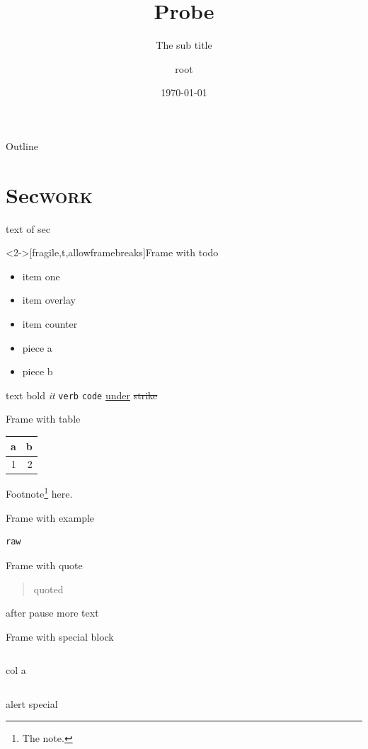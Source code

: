 \documentclass[presentation]{beamer}
\author{root}
\date{\today}
\title{Probe}
\subtitle{The sub \alert{title}}
\begin{document}
\maketitle
\begin{frame}{Outline}
\tableofcontents
\end{frame}

\section{Sec\hfill{}\textsc{work}}
\label{sec:org54d492a}
text of sec
\begin{frame}<2->[fragile,t,allowframebreaks]{Frame with todo}
 \begin{itemize}
\item item one
\item <2-> item overlay
\setcounter{enumi}{2}
\item item counter
\end{itemize}
\begin{itemize}[<+->]
\item piece a
\item piece b
\end{itemize}
text \alert{bold} \emph{it} \texttt{verb} \texttt{code} \uline{under} \sout{strike}
\end{frame}
\begin{frame}[label={sec:org1be5fa0}]{Frame with table}
\begin{center}
\begin{tabular}{rr}
a & b\\[0pt]
\hline
1 & 2\\[0pt]
\end{tabular}
\end{center}

Footnote\footnote{The note.} here.
\end{frame}
\begin{frame}[label={sec:org5fb61ba},fragile]{Frame with example}
 \begin{verbatim}
raw
\end{verbatim}
\end{frame}
\begin{frame}[label={sec:org71b0778}]{Frame with quote}
\begin{quote}
quoted
\end{quote}
\pause after pause
\pause
more text
\vfill
\end{frame}
\begin{frame}[label={sec:org73fd544}]{Frame with special block}
\begin{columns}
\begin{column}
col a
\end{column}
\end{columns}
\begin{alertblock}
alert special
\end{alertblock}
\end{frame}
\end{document}
